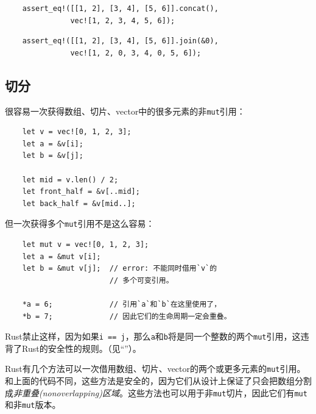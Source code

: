 \begin{verbatim}
    assert_eq!([[1, 2], [3, 4], [5, 6]].concat(),
               vec![1, 2, 3, 4, 5, 6]);
\end{verbatim}

\begin{verbatim}
    assert_eq!([[1, 2], [3, 4], [5, 6]].join(&0),
               vec![1, 2, 0, 3, 4, 0, 5, 6]);
\end{verbatim}

\subsection{切分}\label{split}
很容易一次获得数组、切片、vector中的很多元素的非\texttt{mut}引用：
\begin{verbatim}
    let v = vec![0, 1, 2, 3];
    let a = &v[i];
    let b = &v[j];

    let mid = v.len() / 2;
    let front_half = &v[..mid];
    let back_half = &v[mid..];
\end{verbatim}

但一次获得多个\texttt{mut}引用不是这么容易：
\begin{verbatim}
    let mut v = vec![0, 1, 2, 3];
    let a = &mut v[i];
    let b = &mut v[j];  // error: 不能同时借用`v`的
                        // 多个可变引用。

    *a = 6;             // 引用`a`和`b`在这里使用了，
    *b = 7;             // 因此它们的生命周期一定会重叠。
\end{verbatim}

Rust禁止这样，因为如果\texttt{i == j}，那么\texttt{a}和\texttt{b}将是同一个整数的两个\texttt{mut}引用，这违背了Rust的安全性的规则。（见“”）。

Rust有几个方法可以一次借用数组、切片、vector的两个或更多元素的\texttt{mut}引用。和上面的代码不同，这些方法是安全的，因为它们从设计上保证了只会把数组分割成\emph{非重叠(nonoverlapping)区域}。这些方法也可以用于非\texttt{mut}切片，因此它们有\texttt{mut}和非\texttt{mut}版本。

